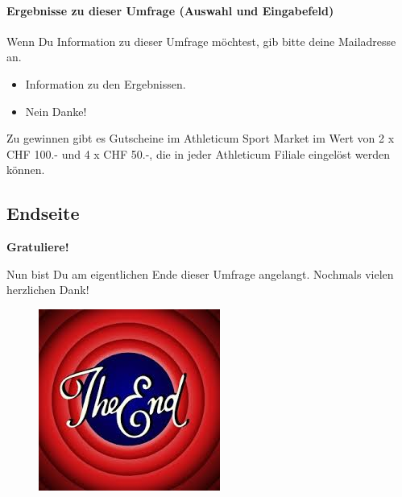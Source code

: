 \paragraph{Ergebnisse zu dieser Umfrage (Auswahl und Eingabefeld)}
Wenn Du Information zu dieser Umfrage möchtest, gib bitte deine Mailadresse an.
    \begin{itemize}
      \item Information zu den Ergebnissen.
      \item Nein Danke!      
    \end{itemize}
Zu gewinnen gibt es Gutscheine im Athleticum Sport Market im Wert von 2 x CHF 100.- und 4 x CHF 50.-, die in jeder Athleticum Filiale eingelöst werden können.
\subsection{Endseite}\label{anhangSection.endseite}
\textbf{Gratuliere!}\par
Nun bist Du am eigentlichen Ende dieser Umfrage angelangt. Nochmals vielen herzlichen Dank!
\begin{figure}
     \centering
     \includegraphics[scale=0.6]{images/anhang/ende.jpeg}
\end{figure}    
    